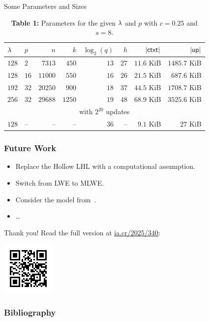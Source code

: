 \documentclass[xcolor=table,10pt,aspectratio=169]{beamer}
\begin{document}
\begin{frame}{Some Parameters and Sizes}
  \begin{table}[htb]
    \centering
    \caption{\textbf{Table 1:} Parameters for the given \(\lambda\) and \(p\) with \(c=0.25\) and \(s = 8\).}\label{tab:params}
    \vspace{0.3\baselineskip}
    \begin{tabular}{l @{\hskip 1em} l @{\hskip 1em} r @{\hskip 1em} r r @{\hskip 1em} r @{\hskip 1em} r @{\hskip 1em} r}
      \toprule
      \(\lambda\) & \(p\) & \(n\) & \(k\) & \(\log_2(q)\) & \(h\) & \(\lvert \mathsf{ctxt} \rvert\) & \(\lvert \mathsf{up} \rvert\) \\
      \midrule
      \(128\) &  \(2\) & \(7313\)  &  \(450\) & \(13\) & \(27\) & \(11.6\) KiB & \(1485.7\) KiB\\
      \(128\) & \(16\) & \(11000\) &  \(550\) & \(16\) & \(26\) & \(21.5\) KiB &  \(687.6\) KiB\\
      \(192\) & \(32\) & \(20250\) &  \(900\) & \(18\) & \(37\) & \(44.5\) KiB & \(1708.7\) KiB\\
      \(256\) & \(32\) & \(29688\) & \(1250\) & \(19\) & \(48\) & \(68.9\) KiB & \(3525.6\) KiB\\
      \midrule
      \multicolumn{8}{c}{\cite{AC:HaiPasSte23} with \(2^{20}\) updates}\\
      \midrule
      \(128\) &     -- &        -- &       -- & \(36\) &     -- &  \(9.1\) KiB &     \(27\) KiB \\
      \bottomrule
    \end{tabular}
  \end{table}
\end{frame}

\begin{frame}
  \frametitle{Future Work}
  \begin{itemize}[label=\textbullet]
    \item Replace the Hollow LHL with a computational assumption.
    \item Switch from LWE to MLWE.
    \item Consider the model from~\cite{EC:AlwFucMul24}.
    \item \dots
  \end{itemize}
\end{frame}

\begin{frame}
  \centering
  Thank you! Read the full version at \href{https://eprint.iacr.org/2025/340}{\underline{ia.cr/2025/340}}:

  \includegraphics[]{qr.png}
\end{frame}

\begin{frame}[allowframebreaks]
  \frametitle{Bibliography}

  
  

\end{frame}
\end{document}
